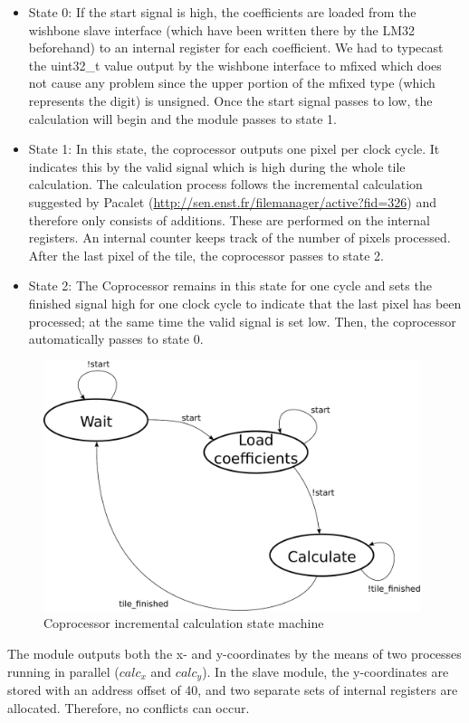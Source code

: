 \begin{itemize}
\item State 0: If the start signal is high, the coefficients are loaded from the wishbone slave interface (which have been written there by the LM32 beforehand) to an internal register for each coefficient. We had to typecast the uint32\_t value output by the wishbone interface to mfixed which does not cause any problem since the upper portion of the mfixed type (which represents the digit) is unsigned. Once the start signal passes to low, the calculation will begin and the module passes to state 1.
\item State 1: In this state, the coprocessor outputs one pixel per clock cycle. It indicates this by the valid signal which is high during the whole tile calculation. The calculation process follows the incremental calculation suggested by Pacalet (\url{http://sen.enst.fr/filemanager/active?fid=326}) and therefore only consists of additions. These are performed on the internal registers. An internal counter keeps track of the number of pixels processed. After the last pixel of the tile, the coprocessor passes to state 2.
\item State 2: The Coprocessor remains in this state for one cycle and sets the finished signal high for one clock cycle to indicate that the last pixel has been processed; at the same time the valid signal is set low. Then, the coprocessor automatically passes to state 0.

\end{itemize}
\begin{figure}[H]
\center
\includegraphics[width=11cm]{figs/coproc_incr_sm.pdf}
\caption{Coprocessor incremental calculation state machine}
\label{incr_sm}
\end{figure}

The module outputs both the x- and y-coordinates by the means of two processes running in parallel (\texttt{$calc_x$} and \texttt{$calc_y$}). In the slave module, the y-coordinates are stored with an address offset of 40, and two separate sets of internal registers are allocated. Therefore, no conflicts can occur.

